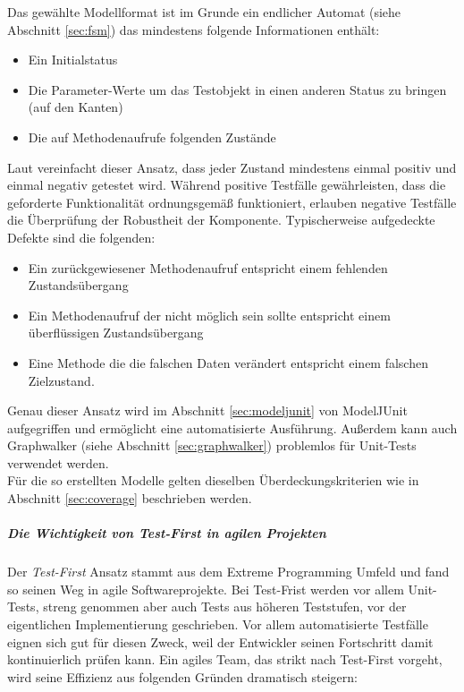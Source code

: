 Das gewählte Modellformat ist im Grunde ein endlicher Automat (siehe Abschnitt \ref{sec:fsm}) das mindestens folgende Informationen enthält:

\begin{itemize}
\item Ein Initialstatus
\item Die Parameter-Werte um das Testobjekt in einen anderen Status zu bringen (auf den Kanten)
\item Die auf Methodenaufrufe folgenden Zustände
\end{itemize}

Laut \citeauthor{vigenschow_objektorientiertes_2004} vereinfacht dieser Ansatz, dass jeder Zustand mindestens einmal positiv und einmal negativ getestet wird. Während positive Testfälle gewährleisten, dass die geforderte Funktionalität ordnungsgemäß funktioniert, erlauben negative Testfälle die Überprüfung der Robustheit der Komponente. Typischerweise aufgedeckte Defekte sind die folgenden:

\begin{itemize}
\item Ein zurückgewiesener Methodenaufruf entspricht einem fehlenden Zustandsübergang
\item Ein Methodenaufruf der nicht möglich sein sollte entspricht einem überflüssigen Zustandsübergang
\item Eine Methode die die falschen Daten verändert entspricht einem falschen Zielzustand.
\end{itemize}

Genau dieser Ansatz wird im Abschnitt \ref{sec:modeljunit} von ModelJUnit aufgegriffen und ermöglicht eine automatisierte Ausführung. Außerdem kann auch Graphwalker (siehe Abschnitt \ref{sec:graphwalker}) problemlos für Unit-Tests verwendet werden.\\
Für die so erstellten Modelle gelten dieselben Überdeckungskriterien wie in Abschnitt \ref{sec:coverage} beschrieben werden.

\subparagraph{Die Wichtigkeit von Test-First in agilen Projekten}  

Der \textit{Test-First} Ansatz stammt aus dem Extreme Programming Umfeld\cite{beck_extreme_2000} und fand so seinen Weg in agile Softwareprojekte. Bei Test-Frist werden vor allem Unit-Tests, streng genommen aber auch Tests aus höheren Teststufen, vor der eigentlichen Implementierung geschrieben. Vor allem automatisierte Testfälle eignen sich gut für diesen Zweck, weil der Entwickler seinen Fortschritt damit kontinuierlich prüfen kann. Ein agiles Team, das strikt nach Test-First vorgeht, wird seine Effizienz aus folgenden Gründen dramatisch steigern\cite{linz_testing_2014}:


